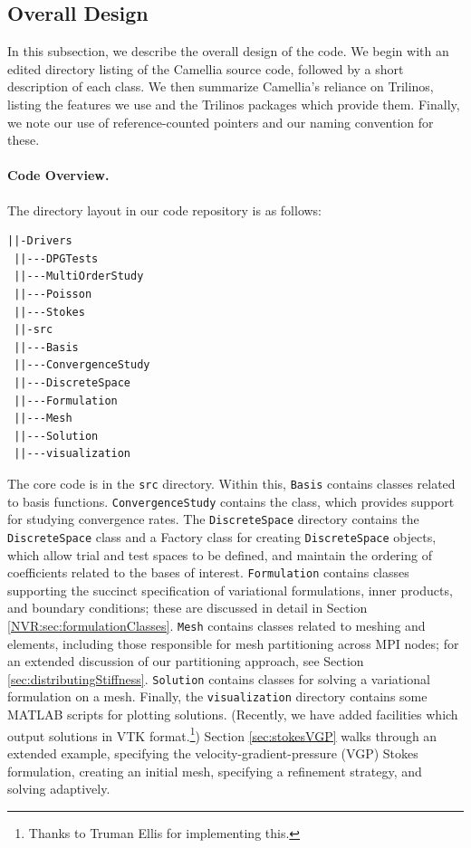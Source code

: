 \subsection{Overall Design}\label{sec:overallDesign}
In this subsection, we describe the overall design of the code.  We begin with an edited directory listing of the Camellia source code, followed by a short description of each class.  We then summarize Camellia's reliance on Trilinos, listing the features we use and the Trilinos packages which provide them.  Finally, we note our use of reference-counted pointers and our naming convention for these.

\paragraph{Code Overview.}
The directory layout in our code repository is as follows:
\begin{center}
\begin{minipage}{0.4\textwidth}
{\bf
\begin{lstlisting}[backgroundcolor=\color{lightlightgreen}]
 ||-Drivers
 ||---DPGTests
 ||---MultiOrderStudy
 ||---Poisson
 ||---Stokes
 ||-src
 ||---Basis
 ||---ConvergenceStudy
 ||---DiscreteSpace
 ||---Formulation
 ||---Mesh
 ||---Solution
 ||---visualization
\end{lstlisting}
}
\end{minipage}
\end{center}

The core code is in the \verb=src= directory.  Within this, \verb=Basis= contains classes related to basis functions.  \verb=ConvergenceStudy= contains the  class, which provides support for studying convergence rates.  The \verb=DiscreteSpace= directory contains the \verb=DiscreteSpace= class and a Factory class for creating \verb=DiscreteSpace= objects, which allow trial and test spaces to be defined, and maintain the ordering of coefficients related to the bases of interest.  \verb=Formulation= contains classes supporting the succinct specification of variational formulations, inner products, and boundary conditions; these are discussed in detail in Section \ref{NVR:sec:formulationClasses}.  \verb=Mesh= contains classes related to meshing and elements, including those responsible for mesh partitioning across MPI nodes; for an extended discussion of our partitioning approach, see Section \ref{sec:distributingStiffness}.  \verb=Solution= contains classes for solving a variational formulation on a mesh.  Finally, the \verb=visualization= directory contains some MATLAB scripts for plotting solutions.  (Recently, we have added facilities which output solutions in VTK format.\footnote{Thanks to Truman Ellis for implementing this.})   Section \ref{sec:stokesVGP} walks through an extended example, specifying the velocity-gradient-pressure (VGP) Stokes formulation, creating an initial mesh, specifying a refinement strategy, and solving adaptively.

